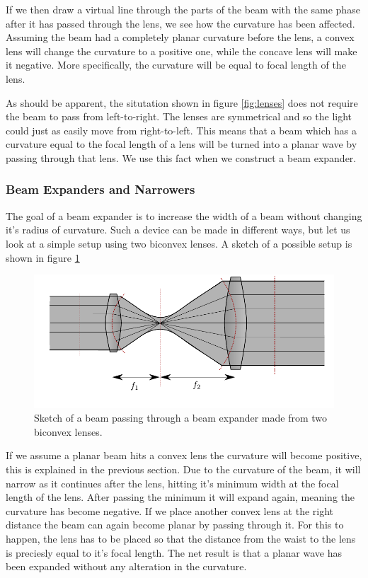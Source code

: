 \documentclass[a4paper, 11pt, notitlepage, english]{article}
\begin{document}
If we then draw a virtual line through the parts of the beam with the same phase after it has passed through the lens, we see how the curvature has been affected. Assuming the beam had a completely planar curvature before the lens, a convex lens will change the curvature to a positive one, while the concave lens will make it negative. More specifically, the curvature will be equal to focal length of the lens.

As should be apparent, the situtation shown in figure \ref{fig:lenses} does not require the beam to pass from left-to-right. The lenses are symmetrical and so the light could just as easily move from right-to-left. This means that a beam which has a curvature equal to the focal length of a lens will be turned into a planar wave by passing through that lens. We use this fact when we construct a beam expander.

\subsubsection{Beam Expanders and Narrowers} \label{sec:beam_expander}

The goal of a beam expander is to increase the width of a beam without changing it's radius of curvature. Such a device can be made in different ways, but let us look at a simple setup using two biconvex lenses. A sketch of a possible setup is shown in figure \ref{fig:beam_expander}

\begin{figure}[htpb]
\centering
\includegraphics[width=\textwidth]{beam_expander.pdf}	
\caption{Sketch of a beam passing through a beam expander made from two biconvex lenses. \label{fig:beam_expander}}
\end{figure}

If we assume a planar beam hits a convex lens the curvature will become positive, this is explained in the previous section. Due to the curvature of the beam, it will narrow as it continues after the lens, hitting it's minimum width at the focal length of the lens. After passing the minimum it will expand again, meaning the curvature has become negative. If we place another convex lens at the right distance the beam can again become planar by passing through it. For this to happen, the lens has to be placed so that the distance from the waist to the lens is preciesly equal to it's focal length. The net result is that a planar wave has been expanded without any alteration in the curvature. 
\end{document}
